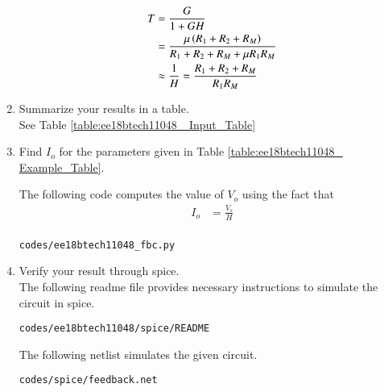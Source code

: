 \begin{enumerate}[label=\arabic*.,ref=\theenumi]
\solution
\begin{align}
T &= \frac{G}{1+GH} \label{eq:ee18btech11048_T}
\\
&= \frac{\mu \left(R_1+R_2+R_M\right)}{R_1+R_2+R_M+ \mu R_1R_M}
\\
 &\approx \frac{1}{H}  = \frac{R_1+R_2+R_M}{R_1R_M} 
\end{align}

\item Summarize your results in a table.
\\
\solution See Table \ref{table:ee18btech11048_ Input_Table}


\begin{table}[!ht]
\centering

\caption{}
\label{table:ee18btech11048_ Input_Table}
\end{table}


\item Find $I_o$ for the parameters given in  Table  \ref{table:ee18btech11048_ Example_Table}.\\
\begin{table}[!ht]
\centering

\caption{}
\label{table:ee18btech11048_ Example_Table}
\end{table}
\solution  The following code computes the value of $V_o$ using the fact that
\begin{align}
I_o &= \frac{V_s}{H}\\
\end{align}
\begin{lstlisting}
codes/ee18btech11048_fbc.py
\end{lstlisting}
\item Verify your result through spice.
\\
\solution The following readme file provides necessary instructions to simulate the circuit in spice.
\begin{lstlisting}
codes/ee18btech11048/spice/README
\end{lstlisting}

The following netlist simulates the given circuit.
\begin{lstlisting}
codes/spice/feedback.net
\end{lstlisting}
\end{enumerate}
